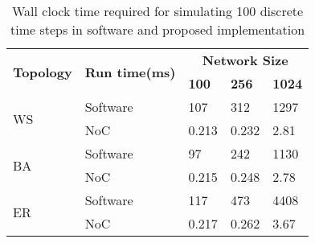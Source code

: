 \begin{table}[!t]
	\centering
	\caption {Wall clock time required for simulating 100 discrete time steps in software and proposed implementation} 
	\begin{tabular}{l|l|l|l|l}
		\toprule
		\multirow{ 2}{*}{\bf Topology}        & \multirow{ 2}{*}{\bf Run time(ms)}           & \multicolumn{3}{c}{\bf Network Size} \\
		\cline{3-5}
		&                              & {\bf 100} & {\bf 256} & {\bf 1024}     \\
		\midrule
		\multirow{ 2}{*}{WS}  & Software   & 107       & 312    & 1297 \\
		                      & NoC        & 0.213     & 0.232  & 2.81 \\
		\midrule
		\multirow{ 2}{*}{BA}  & Software   & 97        & 242    &  1130 \\
		                      & NoC        & 0.215     & 0.248  &  2.78 \\
		\midrule
		\multirow{ 2}{*}{ER}  & Software   & 117       & 473    & 4408\\
		                      & NoC        & 0.217     & 0.262  & 3.67\\
		\bottomrule
	\end{tabular}
\label{tab:latency}
\end{table}